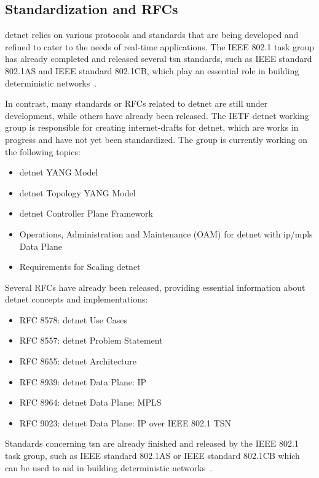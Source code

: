 \documentclass[runningheads]{llncs}
\begin{document}
\subsection*{Standardization and RFCs}
\gls{detnet} relies on various protocols and standards that are being developed and refined to cater to the needs of real-time applications. The IEEE 802.1 task group has already completed and released several \gls{tsn} standards, such as IEEE standard 802.1AS and IEEE standard 802.1CB, which play an essential role in building deterministic networks~\cite{Finn2018}.

In contrast, many standards or RFCs related to \gls{detnet} are still under development, while others have already been released. The IETF \gls{detnet} working group is responsible for creating internet-drafts for \gls{detnet}, which are works in progress and have not yet been standardized. The group is currently working on the following topics:

\begin{itemize}
  \item \gls{detnet} YANG Model
  \item \gls{detnet} Topology YANG Model
  \item \gls{detnet} Controller Plane Framework
  \item Operations, Administration and Maintenance (OAM) for \gls{detnet} with \gls{ip}/\gls{mpls} Data Plane
  \item Requirements for Scaling \gls{detnet}
\end{itemize}

Several RFCs have already been released, providing essential information about \gls{detnet} concepts and implementations:

\begin{itemize}
  \item RFC 8578: \gls{detnet} Use Cases~\cite{rfc8578}
  \item RFC 8557: \gls{detnet} Problem Statement~\cite{rfc8557}
  \item RFC 8655: \gls{detnet} Architecture~\cite{rfc8655}
  \item RFC 8939: \gls{detnet} Data Plane: IP~\cite{rfc8939}
  \item RFC 8964: \gls{detnet} Data Plane: MPLS~\cite{rfc8964}
  \item RFC 9023: \gls{detnet} Data Plane: IP over IEEE 802.1 TSN~\cite{rfc9023}
\end{itemize}

Standards concerning \gls{tsn} are already finished and released by the IEEE 802.1 task group, such as IEEE standard 802.1AS or IEEE standard 802.1CB which can be used to aid in building deterministic networks~\cite{Finn2018}.
\end{document}
